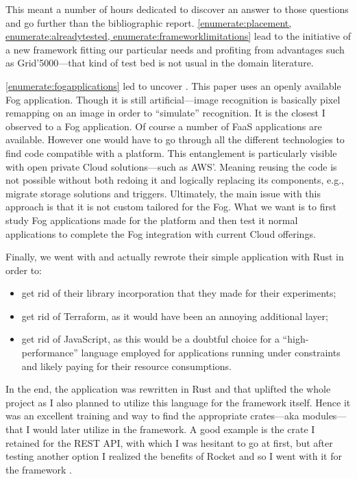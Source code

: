 \documentclass[11pt]{sdm}
\begin{document}
This meant a number of hours dedicated to discover an answer to those questions and go further than the bibliographic report. \cref{enumerate:placement, enumerate:alreadytested, enumerate:frameworklimitations} lead to the initiative of a new framework fitting our particular needs and profiting from advantages such as Grid'5000—that kind of test bed is not usual in the domain literature.

\cref{enumerate:fogapplications} led to uncover . This paper uses an openly available Fog application. Though it is still artificial—image recognition is basically pixel remapping on an image in order to “simulate” recognition. It is the closest I observed to a Fog application. Of course a number of \gls{FaaS} applications are available. However one would have to go through all the different technologies to find code compatible with a platform. This entanglement is particularly visible with open private Cloud solutions—such as AWS'. Meaning reusing the code is not possible without both redoing it and logically replacing its components, e.g., migrate storage solutions and triggers. Ultimately, the main issue with this approach is that it  is not custom tailored for the Fog. What we want is to first study Fog applications made for the platform and then test it normal applications to complete the Fog integration with current Cloud offerings.

Finally, we went with  and actually rewrote their simple application with Rust in order to:
\begin{itemize}
	\item get rid of their library incorporation that they made for their experiments;
	\item get rid of Terraform, as it would have been an annoying additional layer;
	\item get rid of JavaScript, as this would be a doubtful choice for a “high-performance” language employed for applications running under constraints and likely paying for their resource consumptions.
\end{itemize}
In the end, the application was rewritten in Rust and that uplifted the whole project as I also planned to utilize this language for the framework itself. Hence it was an excellent training and way to find the appropriate crates—aka modules—that I would later utilize in the framework. A good example is the crate I retained for the \gls{REST} \gls{API}, with which I was hesitant to go at first, but after testing another option I realized the benefits of Rocket and so I went with it for the framework .
\end{document}
